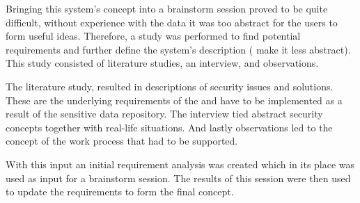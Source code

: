 Bringing this system's concept into a brainstorm session proved to be quite difficult, without experience with the data it was too abstract for the users to form useful ideas.
Therefore, a study was performed to find potential requirements and further define the system's description (\ie{} make it less abstract).
This study consisted of literature studies, an interview, and observations.

The literature study, resulted in descriptions of security issues and solutions.
These are the underlying requirements of the \ivfsystem{} and have to be implemented as a result of the sensitive data repository.
The interview tied abstract security concepts together with real-life situations.
And lastly observations led to the concept of the work process that had to be supported. 

With this input an initial requirement analysis was created which in its place was used as input for a brainstorm session.
The results of this session were then used to update the requirements to form the final concept.